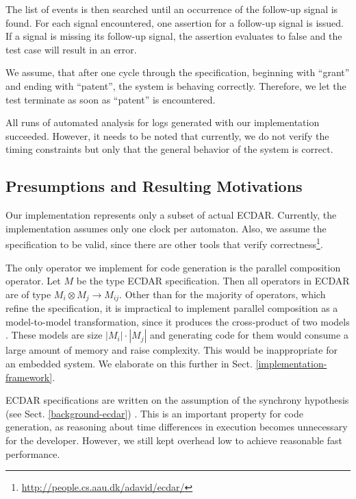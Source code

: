The list of events is then searched until an occurrence of the follow-up signal
is found. For each signal encountered, one assertion for a follow-up signal is
issued. If a signal is missing its follow-up signal, the assertion evaluates to
false and the test case will result in an error.

We assume, that after one cycle through the specification, beginning with
``grant'' and ending with ``patent'', the system is behaving
correctly. Therefore, we let the test terminate as soon as ``patent'' is
encountered.

All runs of automated analysis for logs generated with our implementation
succeeded. However, it needs to be noted that currently, we do not verify the
timing constraints but only that the general behavior of the system is correct.

\subsection{Presumptions and Resulting Motivations}
\label{implementation-presumptions}

Our implementation represents only a subset of actual ECDAR. Currently, the
implementation assumes only one clock per automaton. Also, we assume the
specification to be valid, since there are other tools that verify
correctness\footnote{\url{http://people.cs.aau.dk/adavid/ecdar/}}.

The only operator we implement for code generation is the parallel
composition operator. Let $M$ be the type ECDAR specification. Then
all operators in ECDAR are of type $M_{i}\otimes M_{j}\rightarrow M_{ij}$.
Other than for the majority of operators, which refine the specification,
it is impractical to implement parallel composition as a model-to-model
transformation, since it produces the cross-product of two models
\cite{david_compositional_2012}. These models are size $|M_{i}|\cdot|M_{j}|$
and generating code for them would consume a large amount of memory
and raise complexity. This would be inappropriate for an embedded
system. We elaborate on this further in Sect. \ref{implementation-framework}.

ECDAR specifications are written on the assumption of the synchrony
hypothesis (see Sect. \ref{background-ecdar}) \cite{david_compositional_2012}.
This is an important property for code generation, as reasoning about
time differences in execution becomes unnecessary for the developer.
However, we still kept overhead low to achieve reasonable fast performance.



